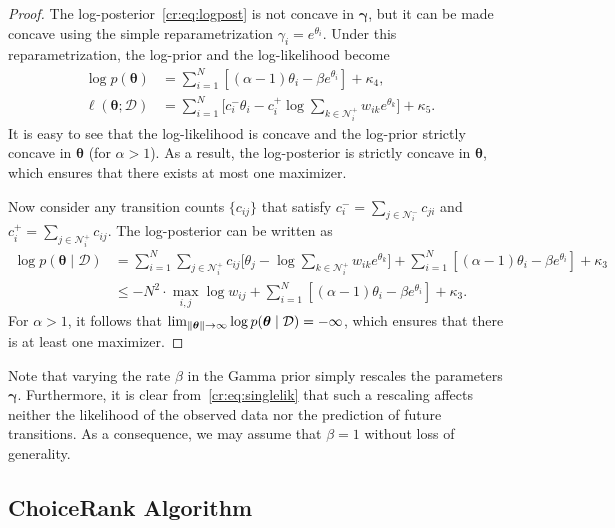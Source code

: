 \begin{proof}
The log-posterior~\eqref{cr:eq:logpost} is not concave in $\bm{\gamma}$, but it can be made concave using the simple reparametrization $\gamma_i = e^{\theta_i}$.
Under this reparametrization, the log-prior and the log-likelihood become
\begin{align*}
\log p(\bm{\theta})
    &= \sum_{i = 1}^N \left[ (\alpha - 1) \theta_i - \beta e^{\theta_i} \right] + \kappa_4, \\
\ell(\bm{\theta} ; \mathcal{D})
    &= \sum_{i = 1}^N \bigg[ c^-_i \theta_i - c^+_i \log \sum_{k \in \mathcal{N}^+_i} w_{ik} e^{\theta_k} \bigg] + \kappa_5.
\end{align*}
It is easy to see that the log-likelihood is concave and the log-prior strictly concave in $\bm{\theta}$ (for $\alpha > 1$).
As a result, the log-posterior is strictly concave in $\bm{\theta}$, which ensures that there exists at most one maximizer.

Now consider any transition counts $\{ c_{ij} \}$ that satisfy $c^-_i = \sum_{j \in \mathcal{N}^-_i} c_{ji}$ and $c^+_i = \sum_{j \in \mathcal{N}^+_i} c_{ij}$.
The log-posterior can be written as
\begin{align*}
\log p(\bm{\theta} \mid \mathcal{D})
    &= \sum_{i = 1}^N \sum_{j \in \mathcal{N}^+_i} c_{ij} \bigg[ \theta_j - \log \sum_{k \in \mathcal{N}^+_i} w_{ik} e^{\theta_k} \bigg]
       + \sum_{i = 1}^N \left[ (\alpha - 1) \theta_i - \beta e^{\theta_i} \right] + \kappa_3\\
    &\le -N^2 \cdot \max_{i,j} \log w_{ij}
       + \sum_{i = 1}^N \left[ (\alpha - 1) \theta_i - \beta e^{\theta_i} \right] + \kappa_3.
\end{align*}
For $\alpha > 1$, it follows that $\lim_{\lVert\bm{\theta}\rVert \to \infty} \log p(\bm{\theta} \mid \mathcal{D}) = -\infty$, which ensures that there is at least one maximizer.
\end{proof}

Note that varying the rate $\beta$ in the Gamma prior simply rescales the parameters $\bm{\gamma}$.
Furthermore, it is clear from~\eqref{cr:eq:singlelik} that such a rescaling affects neither the likelihood of the observed data nor the prediction of future transitions.
As a consequence, we may assume that $\beta = 1$ without loss of generality.

\subsection{ChoiceRank Algorithm}  %
\label{cr:sec:algorithm}

